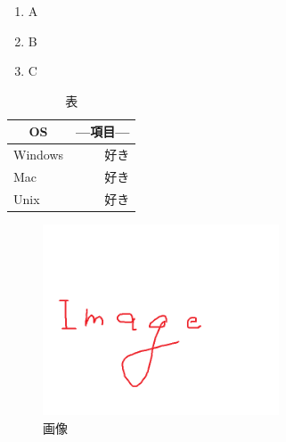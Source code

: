 \documentclass{jsarticle}
\begin{document}
%

\begin{enumerate}
  \item A
  \item B
  \item C
\end{enumerate}

\begin{table}[htb]
  \centering
  \caption{表}
  \begin{tabular}{|l|r|}\hline
   \multicolumn{1}{|c|}{OS} & \multicolumn{1}{|c|}{---項目---} \\ \hline \hline 
    Windows  & 好き \\  \hline
    Mac      & 好き \\  \hline
    Unix     & 好き \\  \hline

  \end{tabular}
\end{table}

\begin{figure}[H]
  \centering
  \includegraphics[width=7cm]{image.jpg}
  \caption{画像} \label{fig:image}
\end{figure}
\end{document}

